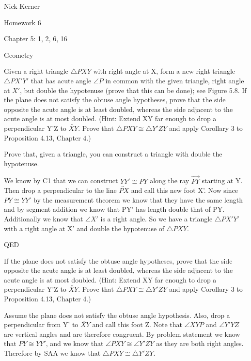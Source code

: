 \documentclass[12pt,letterpaper]{article}
\newcommand{\Proof}{\noindent {\bf Proof: }}
\newcommand{\QED}{\begin{flushright}QED\end{flushright}}
\newcommand{\pro}[1]{\noindent {\bf #1}}
\begin{document}
\begin{flushright}
Nick Kerner

Homework 6

Chapter 5: 1, 2, 6, 16

\end{flushright}
\begin{center}
\large{Geometry}\\
\end{center}

\pro{1} Given a right triangle $\triangle PXY$ with right angle at X, form a new right triangle $\triangle PX'Y'$ that has acute angle $\angle P$ in common with the given triangle, right angle at $X'$, but double the hypotenuse (prove that this can be done);  see Figure 5.8. If the plane does not satisfy the obtuse angle hypotheses, prove that the side opposite the acute angle is at least doubled, whereas the side adjacent to the acute angle is at most doubled.  (Hint: Extend XY far enough to drop a perpendicular Y'Z to $\overleftrightarrow{XY}$.  Prove that $\triangle PXY \cong \triangle{Y'ZY}$ and apply Corollary 3 to Proposition 4.13, Chapter 4.)


Prove that, given a triangle, you can construct a triangle with double the hypotenuse.




\Proof

We know by C1 that we can construct $YY' \cong PY$ along the ray $\overrightarrow{PY}$ starting at Y.  Then drop a perpendicular to the line $\overleftrightarrow{PX}$ and call this new foot X'.  Now since $PY \cong YY'$ by the measurement theorem we know that they have the same length and by segment addition we know that PY' has length double that of PY.  Additionally we know that $\angle X'$ is a right angle. So we have a triangle $\triangle PX'Y'$ with a right angle at X' and double the hypotenuse of $\triangle PXY$.

\QED

If the plane does not satisfy the obtuse angle hypotheses, prove that the side opposite the acute angle is at least doubled, whereas the side adjacent to the acute angle is at most doubled.  (Hint: Extend XY far enough to drop a perpendicular Y'Z to $\overleftrightarrow{XY}$.  Prove that $\triangle PXY \cong \triangle{Y'ZY}$ and apply Corollary 3 to Proposition 4.13, Chapter 4.)

\Proof

Assume the plane does not satisfy the obtuse angle hypothesis.  Also, drop a perpendicular from Y' to $\overleftrightarrow{XY}$ and call this foot Z.  Note that $\angle XYP$ and $\angle Y'YZ$ are vertical angles and are therefore congruent.  By problem statement we know that $PY \cong YY'$, and we know that $\angle PXY \cong \angle Y'ZY$ as they are both right angles.  Therefore by SAA we know that $\triangle PXY \cong \triangle Y'ZY$.  
\end{document}

